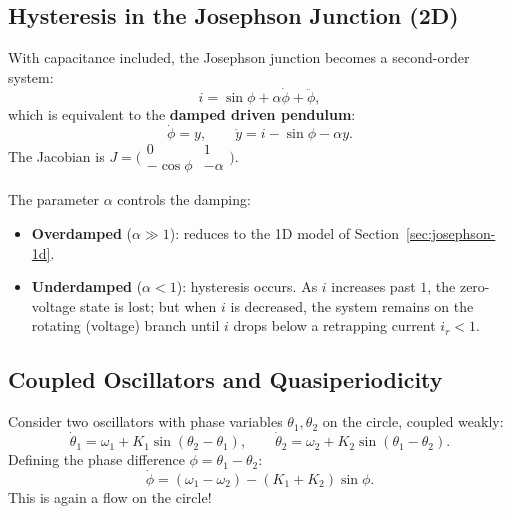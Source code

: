 \documentclass[11pt,letterpaper]{article}
\theoremstyle{definition}
\theoremstyle{plain}
\theoremstyle{remark}
\begin{document}
\subsection{Hysteresis in the Josephson Junction (2D)}\label{sec:jj-2d}

With capacitance included, the Josephson junction becomes a second-order
system:
\begin{equation}
  i = \sin\phi + \alpha\dot{\phi} + \ddot{\phi},
\end{equation}
which is equivalent to the \textbf{damped driven pendulum}:
\begin{equation}
  \dot{\phi} = y, \qquad \dot{y} = i - \sin\phi - \alpha y.
\end{equation}
The Jacobian is
$J = \bigl(\begin{smallmatrix} 0 & 1 \\ -\cos\phi & -\alpha
\end{smallmatrix}\bigr)$.

The parameter $\alpha$ controls the damping:
\begin{itemize}[leftmargin=2em]
\item \textbf{Overdamped} ($\alpha \gg 1$): reduces to the 1D model of
      Section~\ref{sec:josephson-1d}.
\item \textbf{Underdamped} ($\alpha < 1$): hysteresis occurs.  As $i$
      increases past $1$, the zero-voltage state is lost; but when $i$ is
      decreased, the system remains on the rotating (voltage) branch until
      $i$ drops below a retrapping current $i_r < 1$.
\end{itemize}

\subsection{Coupled Oscillators and Quasiperiodicity}\label{sec:coupled-osc}

Consider two oscillators with phase variables $\theta_1,\theta_2$ on the
circle, coupled weakly:
\begin{equation}\label{eq:coupled-osc}
  \dot{\theta}_1 = \omega_1 + K_1 \sin(\theta_2 - \theta_1), \qquad
  \dot{\theta}_2 = \omega_2 + K_2 \sin(\theta_1 - \theta_2).
\end{equation}
Defining the phase difference $\phi = \theta_1 - \theta_2$:
\begin{equation}
  \dot{\phi} = (\omega_1 - \omega_2) - (K_1 + K_2)\sin\phi.
\end{equation}
This is again a flow on the circle!
\end{document}
